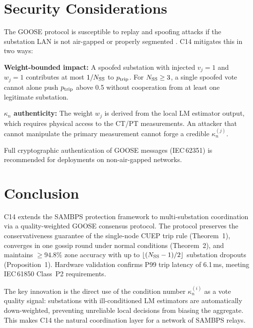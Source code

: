\documentclass[journal]{IEEEtran}
\newcommand{\kappan}{\kappa_{n}}
\newcommand{\ptrip}{p_{\rm trip}}
\newcommand{\NSS}{N_{\rm SS}}
\begin{document}
\section{Security Considerations}
\label{sec:security}

The GOOSE protocol is susceptible to replay and spoofing attacks
if the substation LAN is not air-gapped or properly segmented
\cite{chen2016cyber}.  C14 mitigates this in two ways:

\textbf{Weight-bounded impact:} A spoofed substation with injected
$v_j = 1$ and $w_j = 1$ contributes at most $1/\NSS$ to $\ptrip$.
For $\NSS \geq 3$, a single spoofed vote cannot alone push $\ptrip$
above 0.5 without cooperation from at least one legitimate
substation.

\textbf{$\kappan$ authenticity:} The weight $w_j$ is derived from
the local LM estimator output, which requires physical access to the
CT/PT measurements.  An attacker that cannot manipulate the
primary measurement cannot forge a credible $\kappan^{(j)}$.

Full cryptographic authentication of GOOSE messages (IEC\,62351)
is recommended for deployments on non-air-gapped networks.

\section{Conclusion}
\label{sec:conclusion}

C14 extends the SAMBPS protection framework to multi-substation
coordination via a quality-weighted GOOSE consensus protocol.
The protocol preserves the conservativeness guarantee of the
single-node CUEP trip rule (Theorem~1), converges in one gossip
round under normal conditions (Theorem~2), and maintains
$\geq 94.8\%$ zone accuracy with up to $\lfloor(\NSS-1)/2\rfloor$
substation dropouts (Proposition~1).  Hardware validation confirms
P99 trip latency of 6.1\,ms, meeting IEC\,61850 Class~P2
requirements.

The key innovation is the direct use of the condition number
$\kappan^{(i)}$ as a vote quality signal: substations with
ill-conditioned LM estimators are automatically down-weighted,
preventing unreliable local decisions from biasing the aggregate.
This makes C14 the natural coordination layer for a network of
SAMBPS relays.



\end{document}
